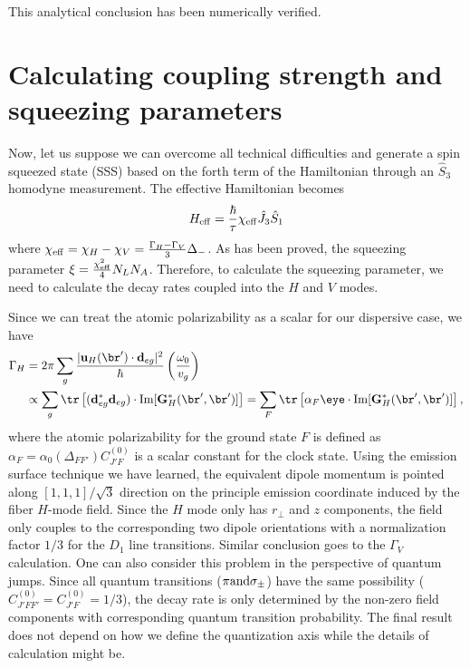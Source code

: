 This analytical conclusion has been numerically verified. 

\section{Calculating coupling strength and squeezing parameters}
Now, let us suppose we can overcome all technical difficulties and generate a spin squeezed state (SSS) based on the forth term of the Hamiltonian through an $ \hat{S}_3 $ homodyne measurement. The effective Hamiltonian becomes
\begin{align}
	H_{\rm eff} = \frac{\hbar}{\tau} \chi_{\rm eff} \hat{J}_3 \hat{S}_1
\end{align}
where $\chi_{\rm eff} = \chi_{H} - \chi_{V}=\frac{\Gamma_H-\Gamma_V}{3}\Delta_-$. As has been proved, the squeezing parameter $ \xi =\frac{\chi_{\rm eff}^2 }{4}N_LN_A $. Therefore, to calculate the squeezing parameter, we need to calculate the decay rates coupled into the $ H $ and $ V $ modes. 

Since we can treat the atomic polarizability as a scalar for our dispersive case, we have 
\begin{align}
\Gamma_H &= 2\pi \sum_g \frac{|\mathbf{u}_H(\br')\cdot \mathbf{d}_{eg}|^2}{\hbar}\left(\frac{\omega_0}{v_g} \right) \\
&\propto \sum_g \tr \left[(\mathbf{d}_{eg}^*\mathbf{d}_{eg})\cdot \mathrm{Im} [\mathbf{G}_H^*(\br',\br')] \right]  = \sum_F \tr \left[ \alpha_F \eye\cdot \mathrm{Im} [\mathbf{G}_H^*(\br',\br')]  \right],
\end{align}
where the atomic polarizability for the ground state $ F $ is defined as $ \alpha_F=\alpha_0(\Delta_{FF'})C_{J'F}^{(0)} $ is a scalar constant for the clock state. Using the emission surface technique we have learned, the equivalent dipole momentum is pointed along $ [1,1,1]/\sqrt{3} $ direction on the principle emission coordinate induced by the fiber $ H $-mode field. Since the $ H $ mode only has $ r\!_\perp $ and $ z $ components, the field only couples to the corresponding two dipole orientations with a normalization factor $ 1/3 $ for the $ D_1 $ line transitions. Similar conclusion goes to the $ \Gamma_V $ calculation. One can also consider this problem in the perspective of quantum jumps. Since all quantum transitions ($ \pi\rm{ and }\sigma_\pm $) have the same possibility ($C_{J'FF'}^{(0)}=C_{J'F}^{(0)}=1/3 $), the decay rate is only determined by the non-zero field components with corresponding quantum transition probability. The final result does not depend on how we define the quantization axis while the details of calculation might be. 

